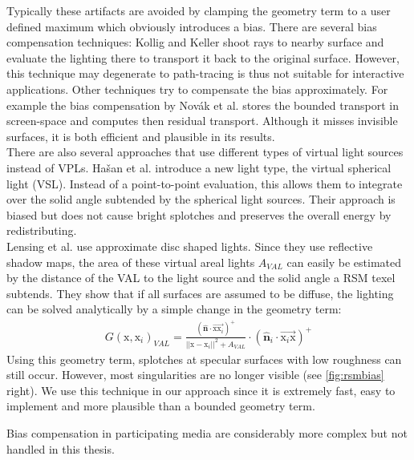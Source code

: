 \documentclass[thesis.tex]{subfiles}
\begin{document}
Typically these artifacts are avoided by clamping the geometry term to a user defined maximum which obviously introduces a bias.
There are several bias compensation techniques:
Kollig and Keller \cite{bib:biascomp:kk04} shoot rays to nearby surface and evaluate the lighting there to transport it back to the original surface.
However, this technique may degenerate to path-tracing is thus not suitable for interactive applications.
Other techniques try to compensate the bias approximately.
For example the bias compensation by Nov\'{a}k et al. \cite{bib:biascomp:novak11} stores the bounded transport in screen-space and computes then residual transport.
Although it misses invisible surfaces, it is both efficient and plausible in its results.
\\
There are also several approaches that use different types of virtual light sources instead of VPLs.
Ha{\v{s}}an et al. \cite{bib:biascomp:vsl} introduce a new light type, the virtual spherical light (VSL).
Instead of a point-to-point evaluation, this allows them to integrate over the solid angle subtended by the spherical light sources.
Their approach is biased but does not cause bright splotches and preserves the overall energy by redistributing.
\\
Lensing et al. \cite{bib:LightskinPaper} use approximate disc shaped lights.
Since they use reflective shadow maps, the area of these virtual areal lights $A_{VAL}$ can easily be estimated by the distance of the VAL to the light source and the solid angle a RSM texel subtends.
They show that if all surfaces are assumed to be diffuse, the lighting can be solved analytically by a simple change in the geometry term:
\begin{align}
G(\mathrm{x}, \mathrm{x}_i)_{VAL} = \frac{(\hat{\mathbf{n}} \cdot \overrightarrow{\mathrm{x}\mathrm{x}_i} )^+}{||\mathrm{x} - \mathrm{x}_i||^2 + A_{VAL}} \cdot (\hat{\mathbf{n}}_i \cdot \overrightarrow{\mathrm{x}_i\mathrm{x}})^+
\end{align}
Using this geometry term, splotches at specular surfaces with low roughness can still occur.
However, most singularities are no longer visible (see \autoref{fig:rsmbias} right).
We use this technique in our approach since it is extremely fast, easy to implement and more plausible than a bounded geometry term.

Bias compensation in participating media are considerably more complex but not handled in this thesis.
\end{document}
